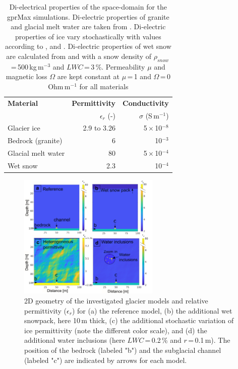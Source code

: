 \begin{table}[H]
\centering
 \caption{Di-electrical properties of the space-domain for the gprMax simulations. Di-electric properties of granite and glacial melt water are taken from \cite{Plewes&Hubbard2001}. Di-electric properties of ice vary stochastically with values according to \cite{Jezek&al1978}, \cite{Johari&Charette1975} and \cite{ Plewes&Hubbard2001}. Di-electric properties of wet snow are calculated from \cite{Tiuri&al1984} and \cite{Granlund&al2010} with a snow density of $\rho_{snow}$\,=\,500\,kg\,m$^{-3}$ and $LWC$\,=\,3\,\%. Permeability $\mu$ and magnetic loss $\Omega$ are kept constant at $\mu$\,=\,1 and $\Omega$\,=\,0 Ohm\,m$^{-1}$ for all materials}
\begin{tabular}{l r r}
\hline
\textbf{Material} & \textbf{Permittivity}  & \textbf{Conductivity}\\
& $\epsilon_r$ (-)& $\sigma$ (S\,m$^{-1}$)\\
\hline
Glacier ice & 2.9 to 3.26 & 5\,$\times$\,10$^{-8}$\\
Bedrock (granite) & 6 & 10$^{-3}$\\
Glacial melt water & 80 & 5\,$\times$\,10$^{-4}$\\
Wet snow & 2.3 & 10$^{-4}$\\
\hline
    \end{tabular}
    \label{tab_material_properties}
\end{table}

\begin{figure}[H]
    \centering
    \includegraphics[width=0.6\textwidth]{chapters/chapter_gprmax/Fig01.pdf}
    \caption{2D geometry of the investigated glacier models and relative permittivity ($\epsilon_r$) for (a) the reference model, (b) the additional wet snowpack, here 10\,m thick, (c) the additional stochastic variation of ice permittivity (note the different color scale), and (d) the additional water inclusions (here $LWC$\,=\,0.2\,\% and $r$\,=\,0.1\,m). The position of the bedrock (labeled "b") and the subglacial channel (labeled "c") are indicated by arrows for each model.}
    \label{fig:model_geometry}
\end{figure}


